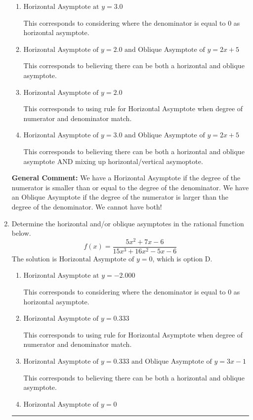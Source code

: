 \documentclass{extbook}[14pt]
\newcommand{\litem}[1]{\item #1

\rule{\textwidth}{0.4pt}}
\begin{document}
\begin{enumerate}
{\begin{enumerate}[label=\Alph*.]
This is the correct answer.
\item \( \text{Horizontal Asymptote at } y = 3.0 \)

This corresponds to considering where the denominator is equal to 0 as horizontal asymptote.
\item \( \text{Horizontal Asymptote of } y = 2.0 \text{ and Oblique Asymptote of } y = 2x + 5 \)

This corresponds to believing there can be both a horizontal and oblique asymptote.
\item \( \text{Horizontal Asymptote of } y = 2.0  \)

This corresponds to using rule for Horizontal Asymptote when degree of numerator and denominator match.
\item \( \text{Horizontal Asymptote of } y = 3.0 \text{ and Oblique Asymptote of } y = 2x + 5 \)

This corresponds to believing there can be both a horizontal and oblique asymptote AND mixing up horizontal/vertical asymoptote.
\end{enumerate}

\textbf{General Comment:} We have a Horizontal Asymptote if the degree of the numerator is smaller than or equal to the degree of the denominator. We have an Oblique Asymptote if the degree of the numerator is larger than the degree of the denominator. We cannot have both!
}
\litem{
Determine the horizontal and/or oblique asymptotes in the rational function below.
\[ f(x) = \frac{5x^{2} +7 x -6}{15x^{3} +16 x^{2} -5 x -6} \]The solution is \( \text{Horizontal Asymptote of } y = 0 \), which is option D.\begin{enumerate}[label=\Alph*.]
\item \( \text{Horizontal Asymptote at } y = -2.000 \)

This corresponds to considering where the denominator is equal to 0 as horizontal asymptote.
\item \( \text{Horizontal Asymptote of } y = 0.333  \)

This corresponds to using rule for Horizontal Asymptote when degree of numerator and denominator match.
\item \( \text{Horizontal Asymptote of } y = 0.333 \text{ and Oblique Asymptote of } y = 3x -1 \)

This corresponds to believing there can be both a horizontal and oblique asymptote.
\item \( \text{Horizontal Asymptote of } y = 0 \)


\end{enumerate}}
\end{enumerate}
\end{document}

